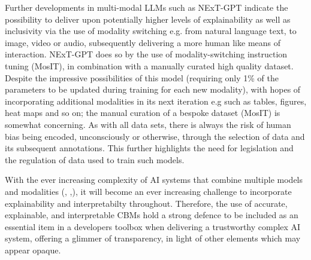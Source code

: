 Further developments in multi-modal LLMs such as NExT-GPT \cite{wuNExTGPTAnytoAnyMultimodal2023} indicate the possibility to deliver upon potentially higher levels of explainability as well as inclusivity via the use of modality switching e.g. from natural language text, to image, video or audio, subsequently delivering a more human like means of interaction. NExT-GPT does so by the use of modality-switching instruction tuning (MosIT), in combination with a manually curated high quality dataset. Despite the impressive possibilities of this model (requiring only 1\% of the parameters to be updated during training for each new modality), with hopes of incorporating additional modalities in its next iteration e.g such as tables, figures, heat maps and so on; the manual curation of a bespoke dataset (MosIT) is somewhat concerning. As with all data sets, there is always the risk of human bias being encoded, unconsciously or otherwise, through the selection of data and its subsequent annotations. This further highlights the need for legislation and the regulation of data used to train such models. 

With the ever increasing complexity of AI systems that combine multiple models and modalities (\cite{wangChatCADInteractiveComputerAided2023}, \cite{wuNExTGPTAnytoAnyMultimodal2023},\cite{yangLanguageBottleLanguage2023}), it will become an ever increasing challenge to incorporate explainability and interpretabilty throughout. Therefore, the use of accurate, explainable, and interpretable CBMs hold a strong defence to be included as an essential item in a developers toolbox when delivering a trustworthy complex AI system, offering a glimmer of transparency, in light of other elements which may appear opaque.